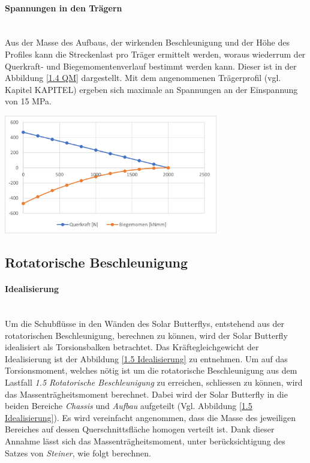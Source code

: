   \paragraph{Spannungen in den Trägern}\mbox{}\\
  Aus der Masse des Aufbaus, der wirkenden Beschleunigung und der Höhe des Profiles kann die Streckenlast pro Träger ermittelt werden, woraus wiederrum der Querkraft- und Biegemomentenverlauf bestimmt werden kann. Dieser ist in der Abbildung \ref{1.4 QM} dargestellt. Mit dem angenommenen Trägerprofil (vgl. Kapitel KAPITEL) ergeben sich maximale an Spannungen an der Einspannung von 15 MPa.

  \begin{center}
    \includegraphics[width=0.7\textwidth]{04_Figures/1.4 QM.png}
    \label{1.4 QM}
  \end{center}




\subsection{Rotatorische Beschleunigung}
\label{1.5 Rotatorische Beschleunigung}
\paragraph{Idealisierung}\mbox{}\\
Um die Schubflüsse in den Wänden des Solar Butterflys, entstehend aus der rotatorischen Beschleunigung, berechnen zu können, wird der Solar Butterfly idealisiert als Torsionsbalken betrachtet. Das Kräftegleichgewicht der Idealisierung ist der Abbildung \ref{1.5 Idealisierung} zu entnehmen. Um auf das Torsionsmoment, welches nötig ist um die rotatorische Beschleunigung aus dem Lastfall \emph{1.5 Rotatorische Beschleunigung} zu erreichen, schliessen zu können, wird das Massenträgheitsmoment berechnet. Dabei wird der Solar Butterfly in die beiden Bereiche \emph{Chassis} und \emph{Aufbau} aufgeteilt (Vgl. Abbildung \ref{1.5 Idealisierung}). Es wird vereinfacht angenommen, dass die Masse des jeweiligen Bereiches auf dessen Querschnittsfläche homogen verteilt ist. Dank dieser Annahme lässt sich das Massenträgheitsmoment, unter berücksichtigung des Satzes von \emph{Steiner}, wie folgt berechnen.


